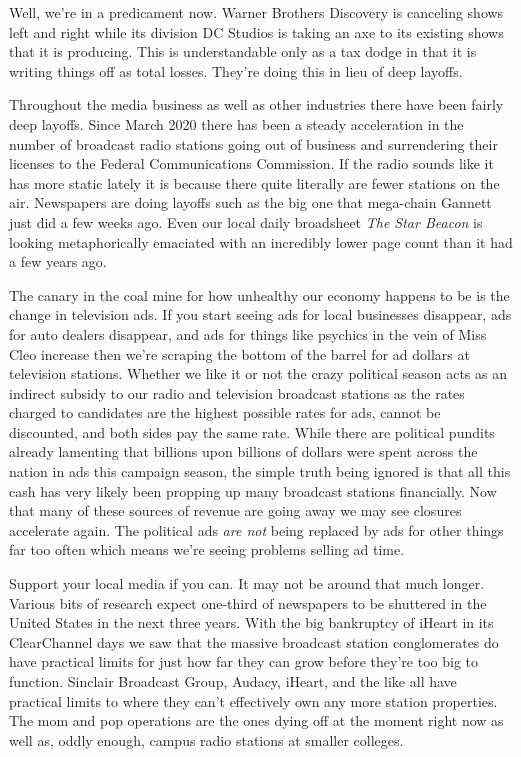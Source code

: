 Well, we're in a predicament now. Warner Brothers Discovery is canceling
shows left and right while its division DC Studios is taking an axe to
its existing shows that it is producing. This is understandable only as
a tax dodge in that it is writing things off as total losses. They're
doing this in lieu of deep layoffs.

Throughout the media business as well as other industries there have
been fairly deep layoffs. Since March 2020 there has been a steady
acceleration in the number of broadcast radio stations going out of
business and surrendering their licenses to the Federal Communications
Commission. If the radio sounds like it has more static lately it is
because there quite literally are fewer stations on the air. Newspapers
are doing layoffs such as the big one that mega-chain Gannett just did a
few weeks ago. Even our local daily broadsheet \emph{The Star Beacon} is
looking metaphorically emaciated with an incredibly lower page count
than it had a few years ago.

The canary in the coal mine for how unhealthy our economy happens to be
is the change in television ads. If you start seeing ads for local
businesses disappear, ads for auto dealers disappear, and ads for things
like psychics in the vein of Miss Cleo increase then we're scraping the
bottom of the barrel for ad dollars at television stations. Whether we
like it or not the crazy political season acts as an indirect subsidy to
our radio and television broadcast stations as the rates charged to
candidates are the highest possible rates for ads, cannot be discounted,
and both sides pay the same rate. While there are political pundits
already lamenting that billions upon billions of dollars were spent
across the nation in ads this campaign season, the simple truth being
ignored is that all this cash has very likely been propping up many
broadcast stations financially. Now that many of these sources of
revenue are going away we may see closures accelerate again. The
political ads \emph{are not} being replaced by ads for other things far
too often which means we're seeing problems selling ad time.

Support your local media if you can. It may not be around that much
longer. Various bits of research expect one-third of newspapers to be
shuttered in the United States in the next three years. With the big
bankruptcy of iHeart in its ClearChannel days we saw that the massive
broadcast station conglomerates do have practical limits for just how
far they can grow before they're too big to function. Sinclair Broadcast
Group, Audacy, iHeart, and the like all have practical limits to where
they can't effectively own any more station properties. The mom and pop
operations are the ones dying off at the moment right now as well as,
oddly enough, campus radio stations at smaller colleges.

